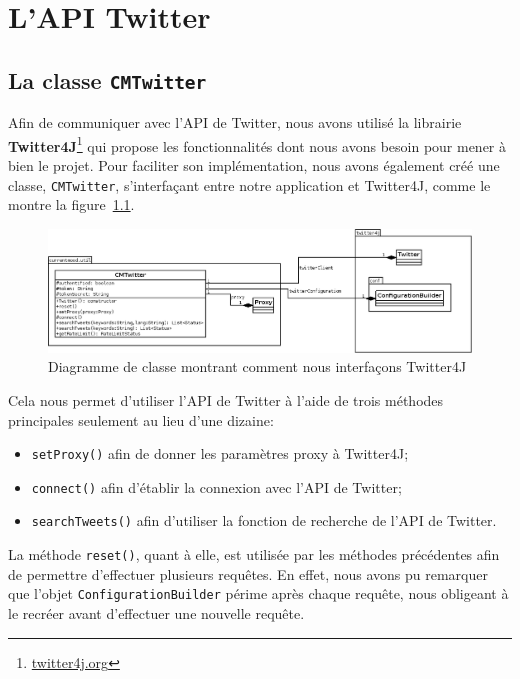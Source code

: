 \documentclass[12pt,a4paper]{report}
\begin{document}

\chapter{L'API Twitter}

\section{La classe \texttt{CMTwitter}}

Afin de communiquer avec l'API de Twitter, nous avons utilisé la librairie
\textbf{Twitter4J}\footnote{\href{http://twitter4j.org}{twitter4j.org}} qui
propose les fonctionnalités dont nous avons besoin pour mener à bien le projet.
Pour faciliter son implémentation, nous avons également créé une classe,
\texttt{CMTwitter}, s'interfaçant entre notre application et Twitter4J, comme le
montre la figure~\ref{uml_cmtwitter}.

\begin{figure}[h]
    \includegraphics[width=1\textwidth]{img/uml_cmtwitter.png}
    \caption{Diagramme de classe montrant comment nous interfaçons Twitter4J}
    \label{uml_cmtwitter}
\end{figure}

Cela nous permet d'utiliser l'API de Twitter à l'aide de trois méthodes
principales seulement au lieu d'une dizaine:

\begin{itemize}
    \item
        \texttt{setProxy()} afin de donner les paramètres proxy à Twitter4J;
    \item
        \texttt{connect()} afin d'établir la connexion avec l'API de Twitter;
    \item
        \texttt{searchTweets()} afin d'utiliser la fonction de recherche de
        l'API de Twitter.
\end{itemize}

La méthode \texttt{reset()}, quant à elle, est utilisée par les méthodes
précédentes afin de permettre d'effectuer plusieurs requêtes. En effet, nous
avons pu remarquer que l'objet \texttt{ConfigurationBuilder} périme après chaque
requête, nous obligeant à le recréer avant d'effectuer une nouvelle requête.
\end{document}
